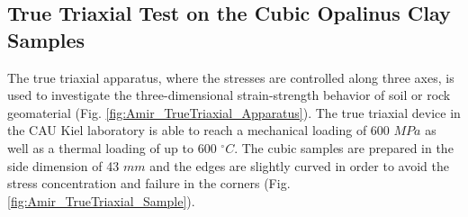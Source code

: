 \subsection{True Triaxial Test on the Cubic Opalinus Clay Samples}
\label{sec:True_Triaxial_Exp}

The true triaxial apparatus, where the stresses are controlled along three axes, is used to investigate the three-dimensional strain-strength behavior of soil or rock geomaterial (Fig. \ref{fig:Amir_TrueTriaxial_Apparatus}). The true triaxial device in the CAU Kiel laboratory is able to reach a mechanical loading of 600 $MPa$ as well as a thermal loading of up to 600 $^{\circ}C$. The cubic samples are prepared in the side dimension of 43 $mm$ and the edges are slightly curved in order to avoid the stress concentration and failure in the corners (Fig. \ref{fig:Amir_TrueTriaxial_Sample}).

